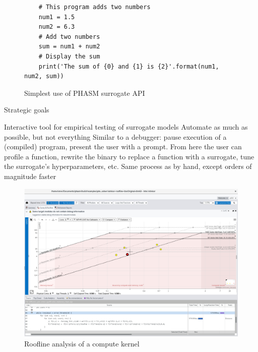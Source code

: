 
\begin{figure}
\begin{verbatim}
    # This program adds two numbers
    num1 = 1.5
    num2 = 6.3
    # Add two numbers
    sum = num1 + num2
    # Display the sum
    print('The sum of {0} and {1} is {2}'.format(num1, num2, sum))
\end{verbatim}
\caption{Simplest use of PHASM surrogate API}
\end{figure}






\begin{block}{Strategic goals}

Interactive tool for empirical testing of surrogate models
Automate as much as possible, but not everything
Similar to a debugger: pause execution of a (compiled) program, present the user with a prompt. From here the user can profile a function, rewrite the binary to replace a function with a surrogate, tune the surrogate’s hyperparameters, etc.
Same process as by hand, except orders of magnitude faster
\end{block}

\begin{figure}
\includegraphics[width=0.8\linewidth]{roofline.png}
\caption{Roofline analysis of a compute kernel}
\end{figure}


